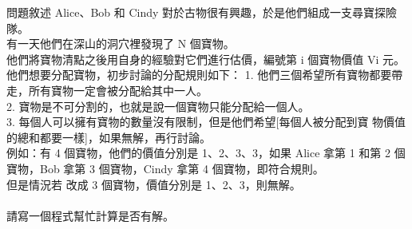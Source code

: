問題敘述 Alice、Bob 和 Cindy 對於古物很有興趣，於是他們組成一支尋寶探險隊。\\
有一天他們在深山的洞穴裡發現了 N 個寶物。\\
他們將寶物清點之後用自身的經驗對它們進行估價，編號第 i 個寶物價值 Vi 元。\\
他們想要分配寶物，初步討論的分配規則如下：  1. 他們三個希望所有寶物都要帶走，所有寶物一定會被分配給其中一人。\\
  2. 寶物是不可分割的，也就是說一個寶物只能分配給一個人。\\
  3. 每個人可以擁有寶物的數量沒有限制，但是他們希望[每個人被分配到寶 物價值的總和都要一樣]，如果無解，再行討論。\\
   例如：有 4 個寶物，他們的價值分別是 1、2、3、3，如果 Alice 拿第 1 和第 2 個寶物，Bob 拿第 3 個寶物，Cindy 拿第 4 個寶物，即符合規則。\\
但是情況若 改成 3 個寶物，價值分別是 1、2、3，則無解。\\
\\
請寫一個程式幫忙計算是否有解。\\